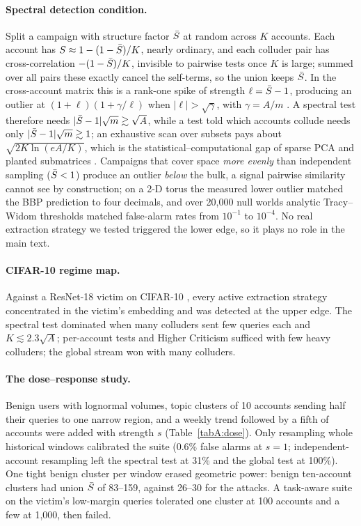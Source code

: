 \paragraph{Spectral detection condition.} Split a campaign with structure factor $\bar S$ at random across $K$ accounts. Each account has $S\approx1-(1-\bar S)/K$, nearly ordinary, and each colluder pair has cross-correlation $-(1-\bar S)/K$, invisible to pairwise tests once $K$ is large; summed over all pairs these exactly cancel the self-terms, so the union keeps $\bar S$. In the cross-account matrix this is a rank-one spike of strength $\ell=\bar S-1$, producing an outlier at $(1+\ell)(1+\gamma/\ell)$ when $|\ell|>\sqrt\gamma$, with $\gamma=A/m$ \citep{baik2005phase,benaych2011eigenvalues}. A spectral test therefore needs $|\bar S-1|\sqrt m\gtrsim\sqrt A$, while a test told which accounts collude needs only $|\bar S-1|\sqrt m\gtrsim1$; an exhaustive scan over subsets pays about $\sqrt{2K\ln(eA/K)}$, which is the statistical--computational gap of sparse PCA and planted submatrices \citep{berthet2013optimal,ma2015computational}. Campaigns that cover space \emph{more evenly} than independent sampling ($\bar S<1$) produce an outlier \emph{below} the bulk, a signal pairwise similarity cannot see by construction; on a 2-D torus the measured lower outlier matched the BBP prediction to four decimals, and over 20{,}000 null worlds analytic Tracy--Widom thresholds \citep{tracy1994level,bornemann2010numerical} matched false-alarm rates from $10^{-1}$ to $10^{-4}$. No real extraction strategy we tested triggered the lower edge, so it plays no role in the main text.

\paragraph{CIFAR-10 regime map.} Against a ResNet-18 victim \citep{he2016resnet} on CIFAR-10 \citep{krizhevsky2009cifar}, every active extraction strategy concentrated in the victim's embedding and was detected at the upper edge. The spectral test dominated when many colluders sent few queries each and $K\lesssim2.3\sqrt A$; per-account tests and Higher Criticism sufficed with few heavy colluders; the global stream won with many colluders.

\paragraph{The dose--response study.} Benign users with lognormal volumes, topic clusters of 10 accounts sending half their queries to one narrow region, and a weekly trend followed by a fifth of accounts were added with strength $s$ (Table~\ref{tabA:dose}). Only resampling whole historical windows calibrated the suite (0.6\% false alarms at $s=1$; independent-account resampling left the spectral test at 31\% and the global test at 100\%). One tight benign cluster per window erased geometric power: benign ten-account clusters had union $\bar S$ of 83--159, against 26--30 for the attacks. A task-aware suite on the victim's low-margin queries tolerated one cluster at 100 accounts and a few at 1{,}000, then failed.

